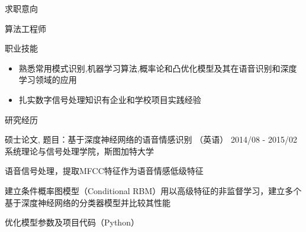 \documentclass{resume} %
\begin{document}
\begin{CJK*}{UTF8}{gbsn}
 
\begin{rSection}{求职意向} 

算法工程师

\end{rSection}


 
\begin{rSection}{职业技能}  
\begin{itemize}
\item 熟悉常用模式识别,机器学习算法,概率论和凸优化模型及其在语音识别和深度学习领域的应用
\item 扎实数字信号处理知识有企业和学校项目实践经验
\end{itemize}
\end{rSection}


\begin{rSection}{研究经历}

\begin{rSubsection}{硕士论文,  题目：基于深度神经网络的语音情感识别 （英语）
}{2014/08 - 2015/02}{系统理论与信号处理学院，斯图加特大学}{}

\item 语音信号处理，提取MFCC特征作为语音情感低级特征
\item 建立条件概率图模型（Conditional RBM）用以高级特征的非监督学习，建立多个基于深度神经网络的分类器模型并比较其性能
\item 优化模型参数及项目代码（Python）

\end{rSubsection}


\end{rSection}
\end{CJK*}
\end{document}
